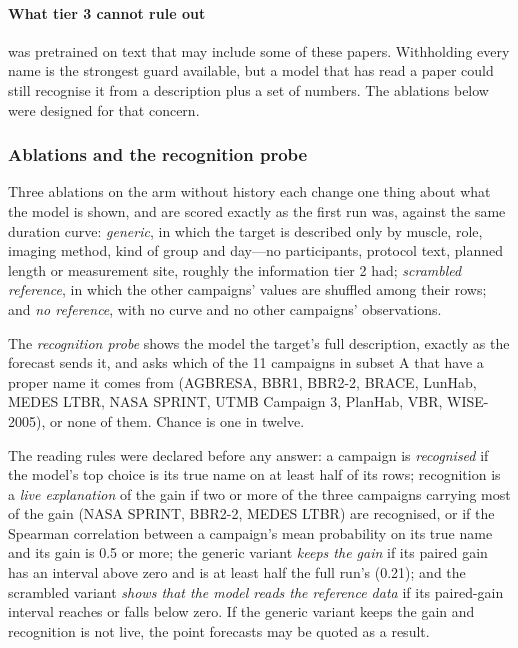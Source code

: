 \paragraph{What tier 3 cannot rule out} \Jev{} was pretrained on text that may include some of these papers.
Withholding every name is the strongest guard available, but a model that has read a paper could still recognise it
from a description plus a set of numbers. The ablations below were designed for that concern.

\subsubsection{Ablations and the recognition probe}
\label{sec:ablation-methods}

Three ablations on the arm without history each change one thing about what the model is shown, and are scored
exactly as the first run was, against the same duration curve:
\emph{generic}, in which the target is described only by muscle, role, imaging method, kind of group and day---no
participants, protocol text, planned length or measurement site, roughly the information tier 2 had;
\emph{scrambled reference}, in which the other campaigns' values are shuffled among their rows; and
\emph{no reference}, with no curve and no other campaigns' observations.

The \emph{recognition probe} shows the model the target's full description, exactly as the forecast sends it, and
asks which of the 11 campaigns in subset A that have a proper name it comes from (AGBRESA, BBR1, BBR2-2, BRACE,
LunHab, MEDES LTBR, NASA SPRINT, UTMB Campaign 3, PlanHab, VBR, WISE-2005), or none of them. Chance is one in
twelve.

The reading rules were declared before any answer: a campaign is \emph{recognised} if the model's top choice is its
true name on at least half of its rows; recognition is a \emph{live explanation} of the gain if two or more of the
three campaigns carrying most of the gain (NASA SPRINT, BBR2-2, MEDES LTBR) are recognised, or if the Spearman
correlation between a campaign's mean probability on its true name and its gain is 0.5 or more; the generic variant
\emph{keeps the gain} if its paired gain has an interval above zero and is at least half the full run's (0.21\pp);
and the scrambled variant \emph{shows that the model reads the reference data} if its paired-gain interval reaches or
falls below zero. If the generic variant keeps the gain and recognition is not live, the point forecasts may be
quoted as a result.

